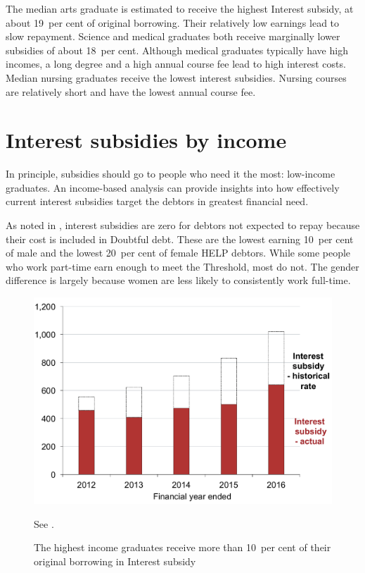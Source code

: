 \documentclass[embargoed]{grattan}
\begin{document}
The median arts graduate is estimated to receive the highest \gls{Interest subsidy}, at about 19~per cent of original borrowing.
Their relatively low earnings lead to slow repayment.
Science and medical graduates both receive marginally lower subsidies of about 18~per cent.
Although medical graduates typically have high incomes, a long degree and a high annual course fee lead to high interest costs.
Median nursing graduates receive the lowest interest subsidies.
Nursing courses are relatively short and have the lowest annual course fee.

\section{Interest subsidies by income}\label{sec:interest-subsidies-by-income}

In principle, subsidies should go to people who need it the most: low-income graduates.
An income-based analysis can provide insights into how effectively current interest subsidies target the debtors in greatest financial need.

As noted in , interest subsidies are zero for debtors not expected to repay because their cost is included in \gls{Doubtful debt}.
These are the lowest earning 10~per cent of male and the lowest 20~per cent of female \gls{HELP} debtors.
While some people who work part-time earn enough to meet the \gls{Threshold}, most do not.
The gender difference is largely because women are less likely to consistently work full-time.

\begin{figure}
\caption{The highest income graduates receive more than 10~per cent of their original borrowing in \gls{Interest subsidy}}\label{fig:fig10-highest-income-grads-receive-over-10pc-original-borrowing-interest-subsidy}

\includegraphics[page=10]{atlas/Chartpack.pdf}

%
{{See .}}
\end{figure}
\end{document}
